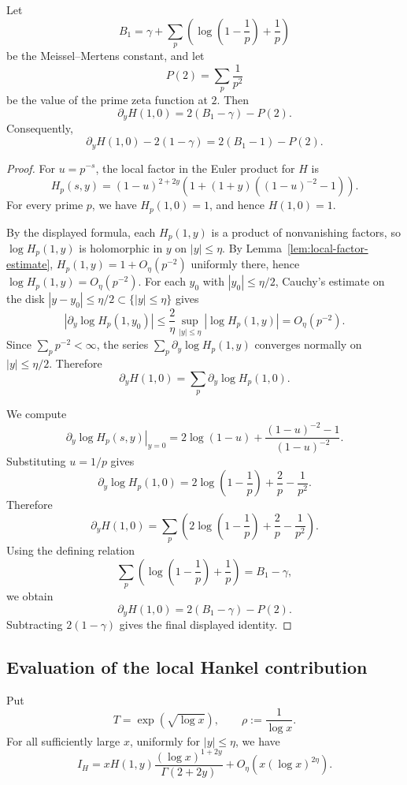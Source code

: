\begin{corollary}\label{cor:Hy-constant}
Let
\[
    B_1=\gamma+\sum_p\left(\log\left(1-\frac1p\right)+\frac1p\right)
\]
be the Meissel--Mertens constant, and let
\[
    P(2)=\sum_p\frac1{p^2}
\]
be the value of the prime zeta function at $2$. Then
\[
    \partial_y H(1,0)=2(B_1-\gamma)-P(2).
\]
Consequently,
\[
    \partial_y H(1,0)-2(1-\gamma)=2(B_1-1)-P(2).
\]
\end{corollary}

\begin{proof}
For $u=p^{-s}$, the local factor in the Euler product for $H$ is
\[
    H_p(s,y)
    =
    (1-u)^{2+2y}
    \left(1+(1+y)\left((1-u)^{-2}-1\right)\right).
\]
For every prime $p$, we have $H_p(1,0)=1$, and hence $H(1,0)=1$.

By the displayed formula, each $H_p(1,y)$ is a
product of nonvanishing factors, so $\log H_p(1,y)$ is holomorphic
in $y$ on $|y|\leq\eta$. By Lemma~\ref{lem:local-factor-estimate},
$H_p(1,y)=1+O_\eta(p^{-2})$ uniformly there, hence
$\log H_p(1,y)=O_\eta(p^{-2})$. For each $y_0$ with
$|y_0|\leq\eta/2$, Cauchy's estimate on the disk
$|y-y_0|\leq\eta/2\subset\{|y|\leq\eta\}$ gives
\[
    |\partial_y\log H_p(1,y_0)|
    \leq \frac{2}{\eta}\sup_{|y|\leq\eta}|\log H_p(1,y)|
    = O_\eta(p^{-2}).
\]
Since $\sum_p p^{-2}<\infty$, the series
$\sum_p\partial_y\log H_p(1,y)$ converges normally on
$|y|\leq\eta/2$. Therefore
\[
    \partial_y H(1,0)=\sum_p \partial_y\log H_p(1,0).
\]

We compute
\[
    \left.\partial_y\log H_p(s,y)\right|_{y=0}
    =
    2\log(1-u)
    +
    \frac{(1-u)^{-2}-1}{(1-u)^{-2}}.
\]
Substituting $u=1/p$ gives
\[
    \partial_y\log H_p(1,0)
    =
    2\log\left(1-\frac1p\right)
    +
    \frac2p-\frac1{p^2}.
\]
Therefore
\[
    \partial_y H(1,0)
    =
    \sum_p
    \left(
    2\log\left(1-\frac1p\right)
    +
    \frac2p-\frac1{p^2}
    \right).
\]
Using the defining relation
\[
    \sum_p\left(\log\left(1-\frac1p\right)+\frac1p\right)=B_1-\gamma,
\]
we obtain
\[
    \partial_y H(1,0)=2(B_1-\gamma)-P(2).
\]
Subtracting $2(1-\gamma)$ gives the final displayed identity.
\end{proof}

\subsection{Evaluation of the local Hankel contribution}
\label{sec:local-hankel-evaluation}

\begin{proposition}\label{prop:local-hankel}
Put
\[
    T=\exp(\sqrt{\log x}),\qquad \rho:=\frac1{\log x}.
\]
For all sufficiently large $x$, uniformly for $|y|\leq\eta$, we have
\[
    I_H
    =
    xH(1,y)\frac{(\log x)^{1+2y}}{\Gamma(2+2y)}
    +O_\eta\left(x(\log x)^{2\eta}\right).
\]
\end{proposition}

